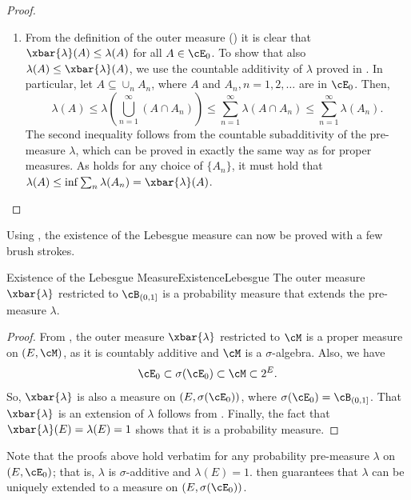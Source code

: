 \begin{proof}
\begin{enumerate}
		\item From the definition of the outer measure () it is clear that $\xbar{\lambda}(A) \le \lambda(A)$ for all $A \in \cE_0$. To show that also $\lambda(A) \le \xbar{\lambda}(A)$, we use the countable additivity of $\lambda$ proved in . In particular, let $A \subseteq \cup_n A_n$, where $A$ and $A_n, n=1, 2, \dots$ are in $\cE_0$. Then,
		      \begin{equation}
			      \lambda(A) \le \lambda\left(\bigcup_{n=1}^\infty (A \cap A_n)\right) \le \sum_{n=1}^\infty \lambda(A \cap A_n) \le \sum_{n=1}^\infty \lambda(A_n).
			      \label{eq:MeasureComparison}
		      \end{equation}
		      The second inequality follows from the countable subadditivity of the pre-measure $\lambda$, which can be proved in exactly the same way as for proper measures. As  holds for any choice of $\{A_n\}$, it must hold that $\lambda(A) \le \inf \sum_n \lambda(A_n) = \xbar{\lambda}(A)$.
	\end{enumerate}
\end{proof}

Using , the existence of the Lebesgue measure can now be proved with a few brush strokes.

\begin{thm}{Existence of the Lebesgue Measure}{ExistenceLebesgue}
	The outer measure $\xbar{\lambda}$ restricted to $\cB_{(0,1]}$ is a probability measure that extends the pre-measure $\lambda$.
\end{thm}

\begin{proof}
	From , the outer measure $\xbar{\lambda}$ restricted to $\cM$ is a proper measure on $(E, \cM)$, as it is countably additive and $\cM$ is a $\sigma$-algebra. Also, we have
	\begin{equation*}
		\cE_0 \subset \sigma(\cE_0) \subset \cM \subset 2^E.
	\end{equation*}
	So, $\xbar{\lambda}$ is also a measure on $(E, \sigma(\cE_0))$, where $\sigma(\cE_0) = \cB_{(0,1]}$. That $\xbar{\lambda}$ is an extension of $\lambda$ follows from . Finally, the fact that $\xbar{\lambda}(E) = \lambda(E) = 1$ shows that it is a probability measure.
\end{proof}

Note that the proofs above hold verbatim for any probability pre-measure $\lambda$ on $(E, \cE_0)$; that is, $\lambda$ is $\sigma$-additive and $\lambda(E) = 1$.  then guarantees that $\lambda$ can be uniquely extended to a measure on $(E, \sigma(\cE_0))$.
